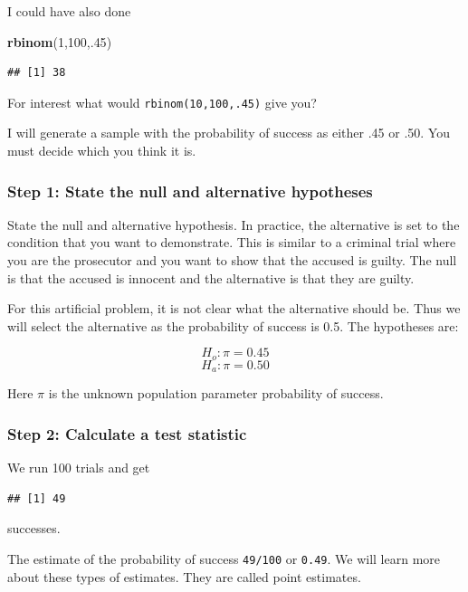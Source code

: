 \documentclass[]{book}
\newenvironment{Shaded}{\begin{snugshade}}{\end{snugshade}}
\newcommand{\KeywordTok}[1]{\textcolor[rgb]{0.13,0.29,0.53}{\textbf{#1}}}
\newcommand{\DecValTok}[1]{\textcolor[rgb]{0.00,0.00,0.81}{#1}}
\newcommand{\NormalTok}[1]{#1}
\theoremstyle{definition}
\theoremstyle{definition}
\theoremstyle{definition}
\theoremstyle{remark}
\begin{document}
I could have also done

\begin{Shaded}
\begin{Highlighting}[]
\KeywordTok{rbinom}\NormalTok{(}\DecValTok{1}\NormalTok{,}\DecValTok{100}\NormalTok{,.}\DecValTok{45}\NormalTok{)}
\end{Highlighting}
\end{Shaded}

\begin{verbatim}
## [1] 38
\end{verbatim}

For interest what would \texttt{rbinom(10,100,.45)} give you?

I will generate a sample with the probability of success as either .45
or .50. You must decide which you think it is.

\subsubsection{Step 1: State the null and alternative
hypotheses}\label{step-1-state-the-null-and-alternative-hypotheses}

State the null and alternative hypothesis. In practice, the alternative
is set to the condition that you want to demonstrate. This is similar to
a criminal trial where you are the prosecutor and you want to show that
the accused is guilty. The null is that the accused is innocent and the
alternative is that they are guilty.

For this artificial problem, it is not clear what the alternative should
be. Thus we will select the alternative as the probability of success is
0.5. The hypotheses are:

\[H_{o}: \pi = 0.45 \] \[H_{a}: \pi = 0.50 \]

Here \(\pi\) is the unknown population parameter probability of success.

\subsubsection{Step 2: Calculate a test
statistic}\label{step-2-calculate-a-test-statistic}

We run 100 trials and get

\begin{verbatim}
## [1] 49
\end{verbatim}

successes.

The estimate of the probability of success \texttt{49/100} or
\texttt{0.49}. We will learn more about these types of estimates. They
are called point estimates.
\end{document}
